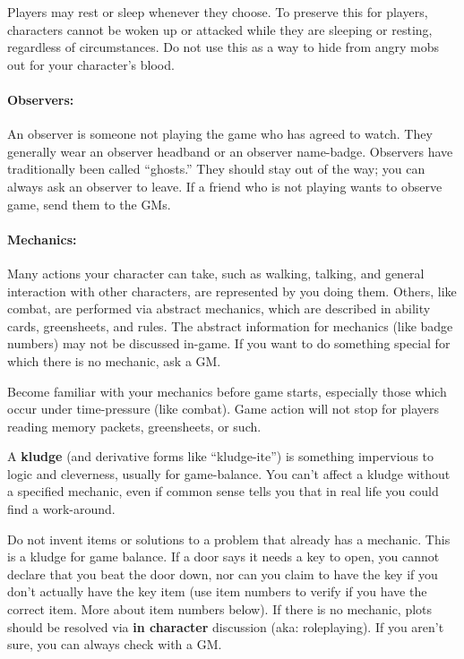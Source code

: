 \documentclass[sheet]{GL2020}
\begin{document}
Players may rest or sleep whenever they choose. To preserve this for players, characters cannot be woken up or attacked while they are sleeping or resting, regardless of circumstances. Do not use this as a way to hide from angry mobs out for your character’s blood.

\paragraph{Observers:} An observer is someone not playing the game who has agreed to watch.  They generally wear an observer headband or an observer name-badge.  Observers have traditionally been called ``ghosts.''  They should stay out of the way; you can always ask an observer to leave.  If a friend who is not playing wants to observe game, send them to the GMs.

\clearpage
\paragraph{Mechanics:} Many actions your character can take, such as walking, talking, and general interaction with other characters, are represented by you doing them.  Others, like combat, are performed via abstract mechanics, which are described in ability cards, greensheets, and rules.  The abstract information for mechanics (like badge numbers) may not be discussed in-game.  If you want to do something special for which there is no mechanic, ask a GM.

Become familiar with your mechanics before game starts, especially those which occur under time-pressure (like combat). Game action will not stop for players reading memory packets, greensheets, or such.

A \textbf{kludge} (and derivative forms like ``kludge-ite'') is something impervious to logic and cleverness, usually for game-balance.  You can't affect a kludge without a specified mechanic, even if common sense tells you that in real life you could find a work-around.

Do not invent items or solutions to a problem that already has a mechanic. This is a kludge for game balance. If a door says it needs a key to open, you cannot declare that you beat the door down, nor can you claim to have the key if you don't actually have the key item (use item numbers to verify if you have the correct item. More about item numbers below).  If there is no mechanic, plots should be resolved via \textbf{in character} discussion (aka: roleplaying). If you aren’t sure, you can always check with a GM. 
\end{document}
